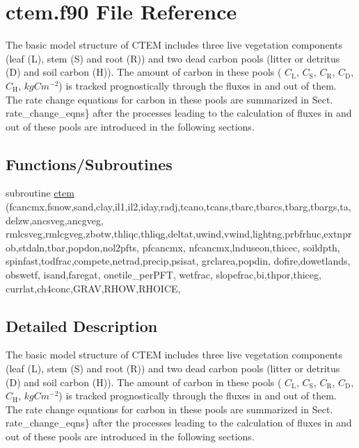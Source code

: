 \hypertarget{ctem_8f90}{}\section{ctem.\+f90 File Reference}
\label{ctem_8f90}


The basic model structure of C\+T\+E\+M includes three live vegetation components (leaf (L), stem (S) and root (R)) and two dead carbon pools (litter or detritus (D) and soil carbon (H)). The amount of carbon in these pools ( $C_\mathrm{L}$, $C_\mathrm{S}$, $C_\mathrm{R}$, $C_\mathrm{D}$, $C_\mathrm{H}$, $kgC m^{-2}$) is tracked prognostically through the fluxes in and out of them. The rate change equations for carbon in these pools are summarized in Sect. rate\+\_\+change\+\_\+eqns\} after the processes leading to the calculation of fluxes in and out of these pools are introduced in the following sections.  


\subsection*{Functions/\+Subroutines}
\begin{DoxyCompactItemize}
\item 
subroutine \hyperlink{ctem_8f90_a2b6b15dcac84105200925dab9dfea7aa}{ctem} (fcancmx,fsnow,sand,clay,il1,il2,iday,radj,tcano,tcans,tbarc,tbarcs,tbarg,tbargs,ta,delzw,ancsveg,ancgveg, rmlcsveg,rmlcgveg,zbotw,thliqc,thliqg,deltat,uwind,vwind,lightng,prbfrhuc,extnprob,stdaln,tbar,popdon,nol2pfts, pfcancmx, nfcancmx,lnduseon,thicec, soildpth, spinfast,todfrac,compete,netrad,precip,psisat, grclarea,popdin, dofire,dowetlands, obswetf, isand,faregat, onetile\+\_\+per\+P\+F\+T, wetfrac, slopefrac,bi,thpor,thiceg, currlat,ch4conc,G\+R\+A\+V,R\+H\+O\+W,R\+H\+O\+I\+C\+E,
\end{DoxyCompactItemize}


\subsection{Detailed Description}
The basic model structure of C\+T\+E\+M includes three live vegetation components (leaf (L), stem (S) and root (R)) and two dead carbon pools (litter or detritus (D) and soil carbon (H)). The amount of carbon in these pools ( $C_\mathrm{L}$, $C_\mathrm{S}$, $C_\mathrm{R}$, $C_\mathrm{D}$, $C_\mathrm{H}$, $kgC m^{-2}$) is tracked prognostically through the fluxes in and out of them. The rate change equations for carbon in these pools are summarized in Sect. rate\+\_\+change\+\_\+eqns\} after the processes leading to the calculation of fluxes in and out of these pools are introduced in the following sections. 



